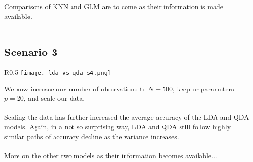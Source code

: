 \documentclass[11pt, oneside]{article}
\begin{document}
Comparisons of KNN and GLM are to come as their information is made available.\\
\\
 

\subsection*{Scenario 3}
\begin{wrapfigure}[]{R}{0.5\textwidth}
\vspace{-0.55cm}
\texttt{[image: lda\_vs\_qda\_s4.png]}
\vspace{-.55cm}
\end{wrapfigure}

We now increase our number of observations to $N=500$, keep or parameters $p=20$, and scale our data.\\
\\

Scaling the data has further increased the average accuracy of the LDA and QDA models. Again, in a not so surprising way, LDA and QDA still follow highly similar paths of accuracy decline as the variance increases.\\
\\

More on the other two models as their information becomes available...\\
\\ 







\end{document}
